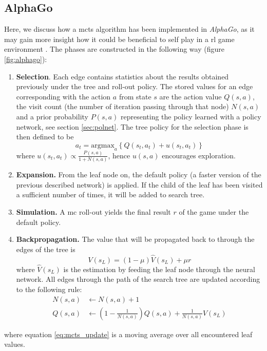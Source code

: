 \subsection{AlphaGo}
Here, we discuss how a \gls{mcts} algorithm has been implemented in \textit{AlphaGo}, as it may gain more insight how it could be beneficial to self play in a \gls{rl} game environment \cite{alphago16}.
The phases are constructed in the following way (figure \ref{fig:alphago}):
\begin{enumerate}
\item \textbf{Selection}. Each edge contains statistics about the results obtained previously under the tree and roll-out policy. The stored values for an edge corresponding with the action $a$ from state $s$ are the action value $Q(s,a)$, the visit count (the number of iteration passing through that node) $N(s,a)$ and a prior probability $P(s,a)$ representing the policy learned with a policy network, see section \ref{sec:polnet}. The tree policy for the selection phase is then defined to be
\begin{equation}
a_t=\text{argmax}_{a}\left\{Q(s_t,a_t)+u(s_t,a_t)\right\}
\end{equation}
where $u(s_t,a_t)\propto\frac{P(s,a)}{1+N(s,a)}$, hence $u(s,a)$ encourages exploration.
\item \textbf{Expansion.} From the leaf node on, the default policy (a faster version of the previous described network) is applied. If the child of the leaf has been visited a sufficient number of times, it will be added to search tree.
\item \textbf{Simulation.} A \gls{mc} roll-out yields the final result $r$ of the game under the default policy. 
\item \textbf{Backpropagation.} The value that will be propagated back to through the edges of the tree is
\begin{equation}
V(s_L)=(1-\mu)\hat{V}(s_L)+\mu r
\end{equation}
where $\hat{V}(s_L)$ is the estimation by feeding the leaf node through the neural network. All edges through the path of the search tree are updated according to the following rule:
\begin{align}
N(s,a) & \leftarrow N(s,a)+1 \\
Q(s,a) & \leftarrow (1-\frac{1}{N(s,a)})Q(s,a)+\frac{1}{N(s,a)}V(s_L)
\label{eq:mcts_update}
\end{align}
\end{enumerate}
where equation \ref{eq:mcts_update} is a moving average over all encountered leaf values.

